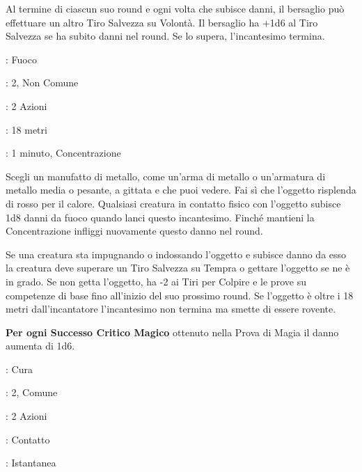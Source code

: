 \begin{multicols}{2}
Al termine di ciascun suo round e ogni volta che subisce danni, il bersaglio può effettuare un altro Tiro Salvezza su Volontà. Il bersaglio ha +1d6 al Tiro Salvezza se ha subito danni nel round. Se lo supera, l'incantesimo termina.

\noindent\colorbox{OBSSgold!10}{
\begin{minipage}{0.95\linewidth}
\begin{description}[noitemsep, topsep=0pt, parsep=0pt, partopsep=0pt, leftmargin=0cm, labelwidth=1.3cm]
	\item[\textbf{Lista}]: Fuoco
	\item[\textbf{Livello}]: 2, Non Comune
	\item[\textbf{Lancio}]: 2 Azioni
	\item[\textbf{Gittata}]: 18 metri
	\item[\textbf{Durata}]: 1 minuto, Concentrazione
\end{description}
\end{minipage}}\smallskip

Scegli un manufatto di metallo, come un'arma di metallo o un'armatura di metallo media o pesante, a gittata e che puoi vedere. Fai sì che l'oggetto risplenda di rosso per il calore. Qualsiasi creatura in contatto fisico con l'oggetto subisce 1d8 danni da fuoco quando lanci questo incantesimo. Finché mantieni la Concentrazione infliggi nuovamente questo danno nel round.

Se una creatura sta impugnando o indossando l'oggetto e subisce danno da esso la creatura deve superare un Tiro Salvezza su Tempra o gettare l'oggetto se ne è in grado. Se non getta l'oggetto, ha -2 ai Tiri per Colpire e le prove su competenze di base fino all'inizio del suo prossimo round. Se l'oggetto è oltre i 18 metri dall'incantatore l'incantesimo non termina ma smette di essere rovente.

\textbf{Per ogni Successo Critico Magico} ottenuto nella Prova di Magia il danno aumenta di 1d6.

\noindent\colorbox{OBSSgold!10}{
\begin{minipage}{0.95\linewidth}
\begin{description}[noitemsep, topsep=0pt, parsep=0pt, partopsep=0pt, leftmargin=0cm, labelwidth=1.3cm]
	\item[\textbf{Lista}]: Cura
	\item[\textbf{Livello}]: 2, Comune
	\item[\textbf{Lancio}]: 2 Azioni
	\item[\textbf{Gittata}]: Contatto
	\item[\textbf{Durata}]: Istantanea
\end{description}
\end{minipage}}\smallskip


\end{multicols}
